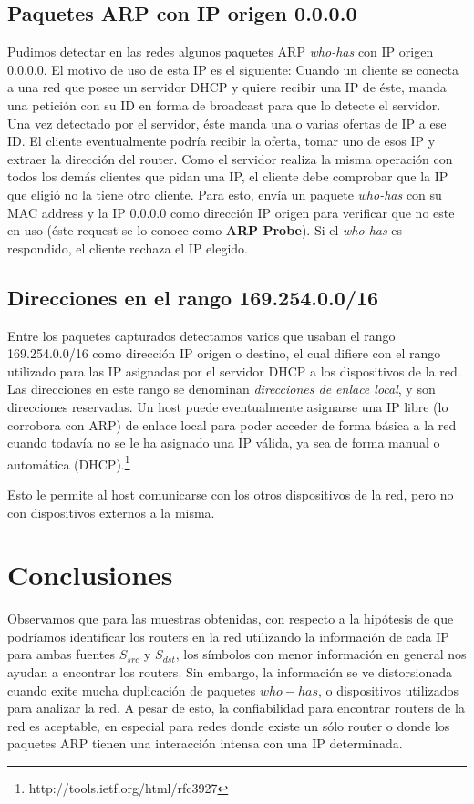 \documentclass[10pt, a4paper]{article}
\begin{document}
\subsection{Paquetes ARP con IP origen 0.0.0.0}

Pudimos detectar en las redes algunos paquetes ARP \textit{who-has} con IP origen 0.0.0.0.
El motivo de uso de esta IP es el siguiente:
Cuando un cliente se conecta a una red que posee un servidor DHCP y quiere recibir una IP de éste, manda una petición con su ID en forma de broadcast para que lo detecte el servidor. Una vez detectado por el servidor, éste manda una o varias ofertas de IP a ese ID.
El cliente eventualmente podría recibir la oferta, tomar uno de esos IP y extraer la dirección del router.
Como el servidor realiza la misma operación con todos los demás clientes que pidan una IP, el cliente debe comprobar que la IP que eligió no la tiene otro cliente. Para esto, envía un paquete \textit{who-has} con su MAC address y la IP 0.0.0.0 como dirección IP origen para verificar que no este en uso (éste request se lo conoce como \textbf{ARP Probe}). Si el \textit{who-has} es respondido, el cliente rechaza el IP elegido.


\subsection{Direcciones en el rango 169.254.0.0/16}

Entre los paquetes capturados detectamos varios que usaban el rango 169.254.0.0/16 como dirección IP origen o destino, el cual difiere con el rango utilizado para las IP asignadas por el servidor DHCP a los dispositivos de la red. Las direcciones en este rango se denominan \textit{direcciones de enlace local}, y son direcciones reservadas. Un host puede eventualmente asignarse una IP libre (lo corrobora con ARP) de enlace local para poder acceder de forma básica a la red cuando todavía no se le ha asignado una IP válida, ya sea de forma manual o automática (DHCP).\footnote{http://tools.ietf.org/html/rfc3927}

Esto le permite al host comunicarse con los otros dispositivos de la red, pero no con dispositivos externos a la misma.

\section{Conclusiones}
Observamos que para las muestras obtenidas, con respecto a la hipótesis de que podríamos identificar los routers en la red utilizando la información de cada IP para ambas fuentes $S_{src}$ y $S_{dst}$, los símbolos con menor información en general nos ayudan a encontrar los routers. Sin embargo, la información se ve distorsionada cuando exite mucha duplicación de paquetes $who-has$, o dispositivos utilizados para analizar la red. A pesar de esto, la confiabilidad para encontrar routers de la red es aceptable, en especial para redes donde existe un sólo router o donde los paquetes ARP tienen una interacción intensa con una IP determinada.
\end{document}
